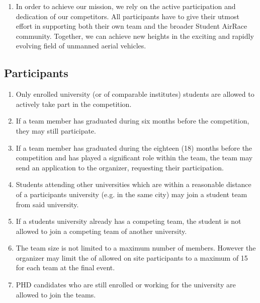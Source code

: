 \begin{enumerate}
 \item In order to achieve our mission, we rely on the active participation and dedication of our competitors. All participants have to give their utmost effort in supporting both their own team and the broader Student AirRace community. Together, we can achieve new heights in the exciting and rapidly evolving field of unmanned aerial vehicles.
\end{enumerate}


    \subsection{Participants}
    \begin{enumerate}
      \item Only enrolled university (or of comparable institutes) students are allowed to actively take part in the competition.
      \item If a team member has graduated during six months before the competition, they may still participate.
      \item If a team member has graduated during the eighteen (18) months before the competition and has played a significant role within the team,
      the team may send an application to the organizer, requesting their participation. 
      \item Students attending other universities which are within a reasonable distance of a participants university (e.g. in the same city) may join
      a student team from said university.
      \item If a students university already has a competing team, the student is not allowed to join a competing team of 
      another university.  
      \item The team size is not limited to a maximum number of members. However the organizer may limit the of allowed on site participants to a maximum of 15 for each team at the final event.
      \item PHD candidates who are still enrolled or working for the university are allowed to join the teams. 
    \end{enumerate}

